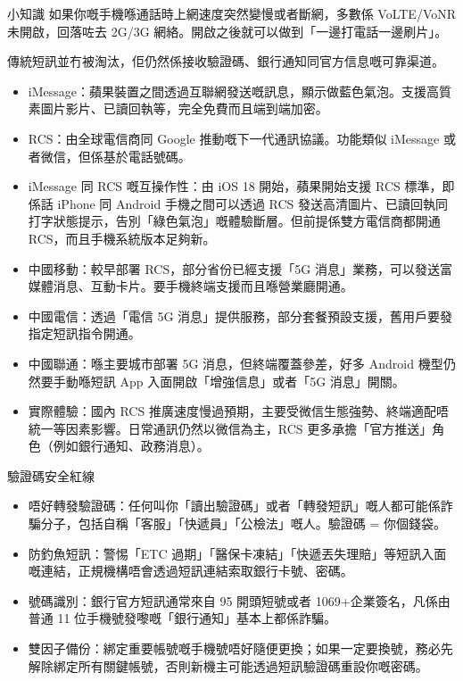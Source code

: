 \begin{tcbinfo}{小知識}
如果你嘅手機喺通話時上網速度突然變慢或者斷網，多數係 VoLTE/VoNR 未開啟，回落咗去 2G/3G 網絡。開啟之後就可以做到「一邊打電話一邊刷片」。

\end{tcbinfo}


傳統短訊並冇被淘汰，佢仍然係接收驗證碼、銀行通知同官方信息嘅可靠渠道。

\begin{itemize}
  \item iMessage：蘋果裝置之間透過互聯網發送嘅訊息，顯示做藍色氣泡。支援高質素圖片影片、已讀回執等，完全免費而且端到端加密。
  \item RCS：由全球電信商同 Google 推動嘅下一代通訊協議。功能類似 iMessage 或者微信，但係基於電話號碼。
  \item iMessage 同 RCS 嘅互操作性：由 iOS 18 開始，蘋果開始支援 RCS 標準，即係話 iPhone 同 Android 手機之間可以透過 RCS 發送高清圖片、已讀回執同打字狀態提示，告別「綠色氣泡」嘅體驗斷層。但前提係雙方電信商都開通 RCS，而且手機系統版本足夠新。
\end{itemize}


\begin{itemize}
  \item 中國移動：較早部署 RCS，部分省份已經支援「5G 消息」業務，可以發送富媒體消息、互動卡片。要手機終端支援而且喺營業廳開通。
  \item 中國電信：透過「電信 5G 消息」提供服務，部分套餐預設支援，舊用戶要發指定短訊指令開通。
  \item 中國聯通：喺主要城市部署 5G 消息，但終端覆蓋參差，好多 Android 機型仍然要手動喺短訊 App 入面開啟「增強信息」或者「5G 消息」開關。
  \item 實際體驗：國內 RCS 推廣速度慢過預期，主要受微信生態強勢、終端適配唔統一等因素影響。日常通訊仍然以微信為主，RCS 更多承擔「官方推送」角色（例如銀行通知、政務消息）。
\end{itemize}

\begin{tcbwarn}{驗證碼安全紅線}
\begin{itemize}
  \item 唔好轉發驗證碼：任何叫你「讀出驗證碼」或者「轉發短訊」嘅人都可能係詐騙分子，包括自稱「客服」「快遞員」「公檢法」嘅人。驗證碼 = 你個錢袋。
  \item 防釣魚短訊：警惕「ETC 過期」「醫保卡凍結」「快遞丟失理賠」等短訊入面嘅連結，正規機構唔會透過短訊連結索取銀行卡號、密碼。
  \item 號碼識別：銀行官方短訊通常來自 95 開頭短號或者 1069+企業簽名，凡係由普通 11 位手機號發嚟嘅「銀行通知」基本上都係詐騙。
  \item 雙因子備份：綁定重要帳號嘅手機號唔好隨便更換；如果一定要換號，務必先解除綁定所有關鍵帳號，否則新機主可能透過短訊驗證碼重設你嘅密碼。
\end{itemize}

\end{tcbwarn}

